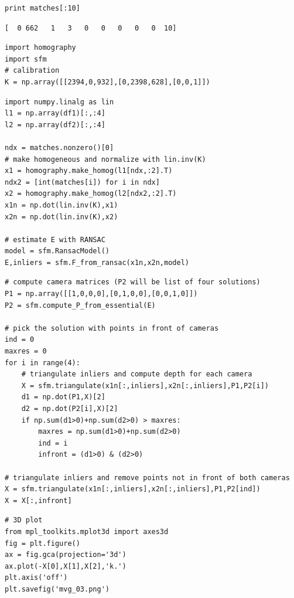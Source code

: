 \documentclass[12pt,fleqn]{article}\usepackage{../common}
\begin{document}
\begin{verbatim}
print matches[:10]
\end{verbatim}

\begin{verbatim}
[  0 662   1   3   0   0   0   0   0  10]
\end{verbatim}

\begin{verbatim}
import homography
import sfm
# calibration
K = np.array([[2394,0,932],[0,2398,628],[0,0,1]])
\end{verbatim}


\begin{verbatim}
import numpy.linalg as lin
l1 = np.array(df1)[:,:4]
l2 = np.array(df2)[:,:4]

ndx = matches.nonzero()[0]
# make homogeneous and normalize with lin.inv(K)
x1 = homography.make_homog(l1[ndx,:2].T)
ndx2 = [int(matches[i]) for i in ndx]
x2 = homography.make_homog(l2[ndx2,:2].T)
x1n = np.dot(lin.inv(K),x1)
x2n = np.dot(lin.inv(K),x2)

# estimate E with RANSAC
model = sfm.RansacModel()
E,inliers = sfm.F_from_ransac(x1n,x2n,model)
\end{verbatim}

\begin{verbatim}
# compute camera matrices (P2 will be list of four solutions)
P1 = np.array([[1,0,0,0],[0,1,0,0],[0,0,1,0]])
P2 = sfm.compute_P_from_essential(E)

# pick the solution with points in front of cameras
ind = 0
maxres = 0
for i in range(4):
    # triangulate inliers and compute depth for each camera
    X = sfm.triangulate(x1n[:,inliers],x2n[:,inliers],P1,P2[i])
    d1 = np.dot(P1,X)[2]
    d2 = np.dot(P2[i],X)[2]
    if np.sum(d1>0)+np.sum(d2>0) > maxres:
        maxres = np.sum(d1>0)+np.sum(d2>0)
        ind = i
        infront = (d1>0) & (d2>0)

# triangulate inliers and remove points not in front of both cameras
X = sfm.triangulate(x1n[:,inliers],x2n[:,inliers],P1,P2[ind])
X = X[:,infront]
\end{verbatim}


\begin{verbatim}
# 3D plot
from mpl_toolkits.mplot3d import axes3d
fig = plt.figure()
ax = fig.gca(projection='3d')
ax.plot(-X[0],X[1],X[2],'k.')
plt.axis('off')
plt.savefig('mvg_03.png')
\end{verbatim}
\end{document}
